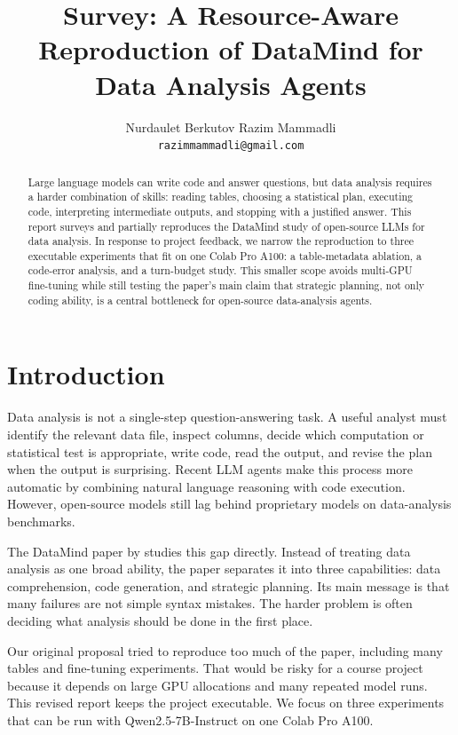 \documentclass[11pt]{article}
\title{Survey: A Resource-Aware Reproduction of DataMind for Data Analysis Agents}
\author{
  Nurdaulet Berkutov \quad Razim Mammadli \\
  \texttt{razimmammadli@gmail.com}
}
\begin{document}
\maketitle

\begin{abstract}
Large language models can write code and answer questions, but data analysis requires a harder combination of skills: reading tables, choosing a statistical plan, executing code, interpreting intermediate outputs, and stopping with a justified answer.
This report surveys and partially reproduces the DataMind study of open-source LLMs for data analysis.
In response to project feedback, we narrow the reproduction to three executable experiments that fit on one Colab Pro A100: a table-metadata ablation, a code-error analysis, and a turn-budget study.
This smaller scope avoids multi-GPU fine-tuning while still testing the paper's main claim that strategic planning, not only coding ability, is a central bottleneck for open-source data-analysis agents.
\end{abstract}

\section{Introduction}

Data analysis is not a single-step question-answering task.
A useful analyst must identify the relevant data file, inspect columns, decide which computation or statistical test is appropriate, write code, read the output, and revise the plan when the output is surprising.
Recent LLM agents make this process more automatic by combining natural language reasoning with code execution.
However, open-source models still lag behind proprietary models on data-analysis benchmarks.

The DataMind paper by \citet{zhu2025openlLMs} studies this gap directly.
Instead of treating data analysis as one broad ability, the paper separates it into three capabilities: data comprehension, code generation, and strategic planning.
Its main message is that many failures are not simple syntax mistakes.
The harder problem is often deciding what analysis should be done in the first place.

Our original proposal tried to reproduce too much of the paper, including many tables and fine-tuning experiments.
That would be risky for a course project because it depends on large GPU allocations and many repeated model runs.
This revised report keeps the project executable.
We focus on three experiments that can be run with Qwen2.5-7B-Instruct on one Colab Pro A100.
\end{document}
